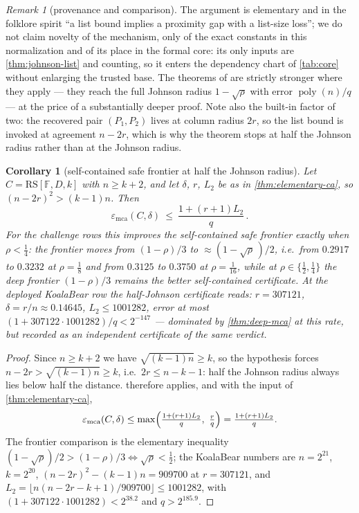 \documentclass[11pt]{article}
\newtheorem{corollary}[theorem]{Corollary}
\theoremstyle{definition}
\theoremstyle{remark}
\newtheorem{remark}[theorem]{Remark}
\newcommand{\F}{\mathbb{F}}
\newcommand{\RS}{\mathrm{RS}}
\newcommand{\emca}{\varepsilon_{\mathrm{mca}}}
\begin{document}
\begin{remark}[provenance and comparison]\label{rem:ca-provenance}
The argument is elementary and in the folklore spirit ``a list bound implies a proximity gap with a list-size loss''; we do not claim novelty of the mechanism, only of the exact constants in this normalization and of its place in the formal core: its only inputs are \cref{thm:johnson-list} and counting, so it enters the dependency chart of \cref{tab:core} without enlarging the trusted base. The theorems of \cite{BCIKS20,BCHKS25} are strictly stronger where they apply --- they reach the full Johnson radius $1-\sqrt\rho$ with error $\operatorname{poly}(n)/q$ --- at the price of a substantially deeper proof. Note also the built-in factor of two: the recovered pair $(P_1,P_2)$ lives at column radius $2r$, so the list bound is invoked at agreement $n-2r$, which is why the theorem stops at half the Johnson radius rather than at the Johnson radius.
\end{remark}

\begin{corollary}[self-contained safe frontier at half the Johnson radius]\label{cor:self-contained-safe}
Let $C=\RS[\F,D,k]$ with $n\ge k+2$, and let $\delta$, $r$, $L_2$ be as in \cref{thm:elementary-ca}, so $(n-2r)^2>(k-1)n$. Then
\[
\emca(C,\delta)\ \le\ \frac{1+(r+1)L_2}{q}\,.
\]
For the challenge rows this improves the self-contained safe frontier exactly when $\rho<\tfrac14$: the frontier moves from $(1-\rho)/3$ to $\approx(1-\sqrt\rho\,)/2$, i.e.\ from $0.2917$ to $0.3232$ at $\rho=\tfrac18$ and from $0.3125$ to $0.3750$ at $\rho=\tfrac1{16}$, while at $\rho\in\{\tfrac12,\tfrac14\}$ the deep frontier $(1-\rho)/3$ remains the better self-contained certificate. At the deployed KoalaBear row the half-Johnson certificate reads: $r=307121$, $\delta=r/n\approx0.14645$, $L_2\le1001282$, error at most $(1+307122\cdot1001282)/q<2^{-147}$ --- dominated by \cref{thm:deep-mca} at this rate, but recorded as an independent certificate of the same verdict.
\end{corollary}

\begin{proof}
Since $n\ge k+2$ we have $\sqrt{(k-1)n}\ge k$, so the hypothesis forces $n-2r>\sqrt{(k-1)n}\ge k$, i.e.\ $2r\le n-k-1$: half the Johnson radius always lies below half the distance.  therefore applies, and with the input of \cref{thm:elementary-ca},
\[
\emca(C,\delta)\le\max\Bigl(\tfrac{1+(r+1)L_2}{q},\ \tfrac rq\Bigr)=\tfrac{1+(r+1)L_2}{q}.
\]
The frontier comparison is the elementary inequality $(1-\sqrt\rho)/2>(1-\rho)/3\iff\sqrt\rho<\tfrac12$; the KoalaBear numbers are $n=2^{21}$, $k=2^{20}$, $(n-2r)^2-(k-1)n=909700$ at $r=307121$, and $L_2=\lfloor n(n-2r-k+1)/909700\rfloor\le1001282$, with $(1+307122\cdot1001282)<2^{38.2}$ and $q>2^{185.9}$.
\end{proof}
\end{document}
